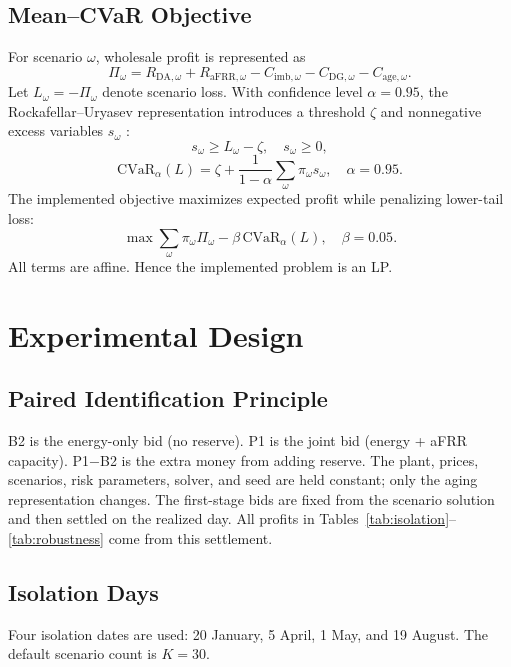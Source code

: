 \documentclass[journal,12pt,twocolumn]{IEEEtran}
\begin{document}
\subsection{Mean--CVaR Objective}
For scenario $\omega$, wholesale profit is represented as
\begin{equation}
\Pi_{\omega} = R_{\text{DA},\omega} + R_{\text{aFRR},\omega} - C_{\text{imb},\omega} - C_{\text{DG},\omega} - C_{\text{age},\omega}.
\label{eq:profit}
\end{equation}
Let $L_{\omega} = -\Pi_{\omega}$ denote scenario loss. With confidence level $\alpha = 0.95$, the Rockafellar--Uryasev representation introduces a threshold $\zeta$ and nonnegative excess variables $s_{\omega}$ \cite{Rockafellar2000,Rockafellar2002}:
\begin{equation}
s_{\omega} \geq L_{\omega} - \zeta, \quad s_{\omega} \geq 0,
\label{eq:cvar_aux}
\end{equation}
\begin{equation}
\text{CVaR}_{\alpha}(L) = \zeta + \frac{1}{1-\alpha} \sum_{\omega} \pi_{\omega} s_{\omega}, \quad \alpha = 0.95.
\label{eq:cvar}
\end{equation}
The implemented objective maximizes expected profit while penalizing lower-tail loss:
\begin{equation}
\max \sum_{\omega} \pi_{\omega} \Pi_{\omega} - \beta \, \text{CVaR}_{\alpha}(L), \quad \beta = 0.05.
\label{eq:objective}
\end{equation}
All terms are affine. Hence the implemented problem is an LP.

\section{Experimental Design}
\label{sec:experimental}

\subsection{Paired Identification Principle}
B2 is the energy-only bid (no reserve). P1 is the joint bid (energy + aFRR capacity). P1$-$B2 is the extra money from adding reserve. The plant, prices, scenarios, risk parameters, solver, and seed are held constant; only the aging representation changes. The first-stage bids are fixed from the scenario solution and then settled on the realized day. All profits in Tables~\ref{tab:isolation}--\ref{tab:robustness} come from this settlement.

\subsection{Isolation Days}
Four isolation dates are used: 20 January, 5 April, 1 May, and 19 August. The default scenario count is $K = 30$.
\end{document}

